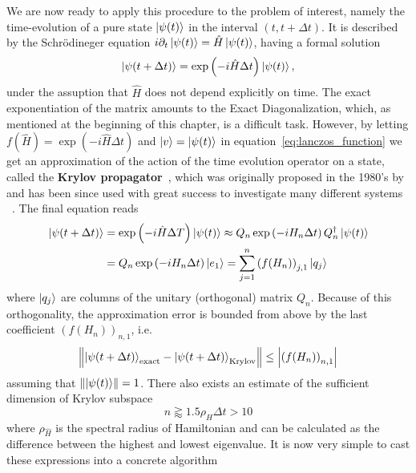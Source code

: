 We are now ready to apply this procedure to the problem of interest, namely the time-evolution of a pure
state \(\ket{\psi(t)}\) in the interval \(\left(t, t+\Delta t\right)\). It is described by the Schr{\"o}dineger equation
\(i\partial_t \ket{\psi(t)} = \hat{H} \ket{\psi(t)}\), having a formal solution
\begin{equation}
	\ket{\psi(t+\Delta t)} = \exp\left(-i \hat{H} \Delta t\right) \ket{\psi(t)},
\end{equation}
under the assuption that \(\hat{H}\) does not depend explicitly on time. The exact exponentiation of the matrix amounts to the Exact
Diagonalization, which, as mentioned at the beginning of this chapter, is a difficult task. However, by letting \(f(\hat{H}) =
\exp\left(-i \hat{H} \Delta t\right)\) and \(\ket{v} = \ket{\psi(t)}\) in equation~\eqref{eq:lanczos_function} we
get an approximation of the action of the time
evolution operator on a state, called the \textbf{Krylov propagator}~\autocite{Moler2003}, which was
originally proposed in the 1980's by~\textcite{Park1986} and has been since used with great success to
investigate many different systems ~\autocite{Schmitteckert2004,Stanek2013,Zaletel2015,Dargel2012}. The final equation
reads
\begin{align}
	\ket{\psi(t+\Delta t)} & = \exp\left(-i \hat{H} \Delta T\right) \ket{\psi(t)} \approx
	Q_n \exp\left(-i H_n \Delta t\right) Q_n^{\dagger}\ket{\psi(t)}                                                                \\
	                       & = Q_n \exp\left(-i H_n \Delta t\right) \ket{e_1} = \sum_{j=1}^{n} \left(f(H_n)\right)_{j,1} \ket{q_j}
\end{align}
where \(\ket{q_j}\) are columns of the unitary (orthogonal) matrix \(Q_n\). Because of this orthogonality,
the approximation error is bounded from above by the last coefficient \(\left(f(H_n)\right)_{n,1}\), i.e.
\begin{equation}
	\norm{\ket{\psi(t+\Delta t)}_{\textrm{exact}} - \ket{\psi(t+\Delta t)}_{\textrm{Krylov}}} \leq \abs{\left(f(H_n)\right)_{n,1}}
\end{equation}
assuming that \(\norm{\ket{\psi(t)}} = 1\). There also exists an estimate of the sufficient dimension of Krylov
subspace~\autocite{Mohankumar2006}
\begin{equation}
	n \gtrapprox  1.5 \rho_{\hat{H}} \Delta t > 10
\end{equation}
where \(\rho_{\hat{H}}\) is the spectral radius of Hamiltonian and can be calculated as the difference between the highest and lowest eigenvalue.
It is now very simple to cast these expressions into a concrete algorithm

